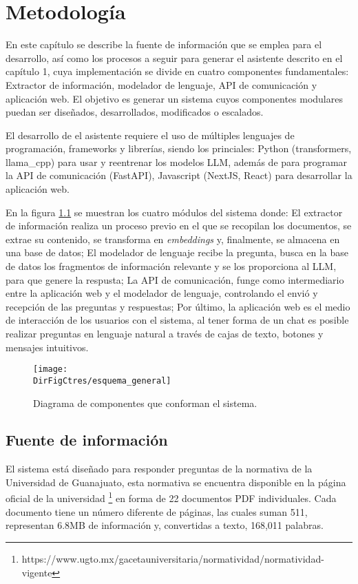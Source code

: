 \chapter{Metodología}

En este capítulo se describe la fuente de información que se emplea
para el desarrollo, así como los procesos a seguir para generar el asistente
descrito en el capítulo 1, cuya implementación se divide en cuatro componentes
fundamentales: Extractor de información, modelador de lenguaje, API de
comunicación y aplicación web. El objetivo es generar un sistema cuyos
componentes modulares puedan ser diseñados, desarrollados, modificados o
escalados.

El desarrollo de el asistente requiere el uso de múltiples lenguajes de programación,
frameworks y librerías, siendo los princiales: Python (transformers, llama\_cpp)
para usar y reentrenar los modelos LLM, además de para programar la API de
comunicación (FastAPI), Javascript (NextJS, React) para desarrollar la aplicación
web.

En la figura \ref{fig:esquema_general} se muestran los cuatro módulos del
sistema donde: El extractor de información realiza un proceso previo en el que
se recopilan los documentos, se extrae su contenido, se transforma en
\textit{embeddings} y, finalmente, se almacena en una base de datos; El
modelador de lenguaje recibe la pregunta, busca en la base de datos los
fragmentos de información relevante y se los proporciona al LLM, para que
genere la respusta; La API de comunicación, funge como intermediario entre la
aplicación web y el modelador de lenguaje, controlando el envió y recepción de
las preguntas y respuestas; Por último, la aplicación web es el medio de
interacción de los usuarios con el sistema, al tener forma de un chat es
posible realizar preguntas en lenguaje natural a través de cajas de texto, botones
y mensajes intuitivos.

\begin{figure}[]
    \centering
    \texttt{[image: \\DirFigCtres/esquema\_general]}
    \caption{Diagrama de componentes que conforman el sistema.}
    \label{fig:esquema_general}
\end{figure}

\section{Fuente de información}

El sistema está diseñado para responder preguntas de la normativa de la
Universidad de Guanajuato, esta normativa se encuentra disponible en la página
oficial de la universidad
\footnote{https://www.ugto.mx/gacetauniversitaria/normatividad/normatividad-vigente}
en forma de 22 documentos PDF individuales. Cada documento tiene un número
diferente de páginas, las cuales suman 511, representan 6.8MB de información y,
convertidas a texto, 168,011 palabras.

